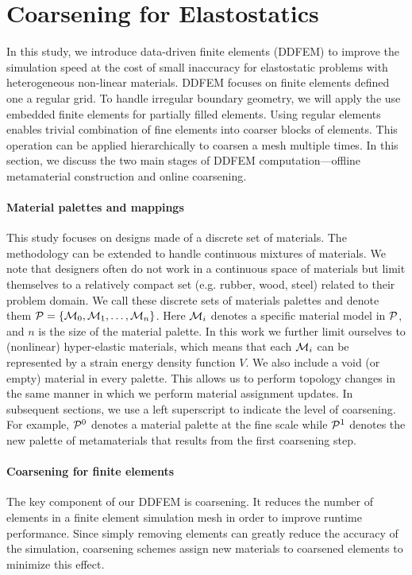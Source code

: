 \section{Coarsening for Elastostatics}
In this study, we introduce data-driven finite elements (DDFEM) to 
improve the simulation speed at the cost of small inaccuracy for elastostatic problems with heterogeneous non-linear materials. DDFEM focuses on finite elements defined one a regular grid.
To handle irregular boundary geometry, we will apply the use embedded finite elements for partially filled elements.
Using regular elements enables trivial combination of fine elements into coarser blocks of elements. This operation can be applied hierarchically to coarsen a mesh multiple times.
In this section, we discuss the two main stages of DDFEM computation---offline metamaterial construction and online coarsening.

\paragraph{Material palettes and mappings}
This study focuses on designs made of a discrete set of materials. The methodology can be extended to handle continuous mixtures of materials.
We note that designers often do not work in a continuous space of materials but limit themselves to a relatively compact set (e.g. rubber, wood, steel) related to their problem domain. We call these discrete sets of materials palettes and denote them $\mathcal{P}=\{\mathcal{M}_0, \mathcal{M}_1, \hdots, \mathcal{M}_n\}$. Here $\mathcal{M}_i$ denotes a specific material model in $\mathcal{P}$, and $n$ is the size of the material palette. In this work we further limit ourselves to (nonlinear) hyper-elastic materials, which means that each $\mathcal{M}_i$ can be represented by a strain energy density function $V$.
We also include a void (or empty) material in every palette. This allows us to perform topology changes in the same manner in which we perform material assignment updates.
In subsequent sections, we use a left superscript to indicate the level of coarsening. For example, $\mathcal{P}^0$ denotes a material palette at the fine scale while $\mathcal{P}^1$ denotes the new palette of metamaterials that results from the first coarsening step.

\paragraph{Coarsening for finite elements}
The key component of our DDFEM is coarsening. It reduces the number of elements in a finite element simulation mesh in order to improve runtime performance. Since simply removing elements can greatly reduce the accuracy of the simulation, coarsening schemes assign new materials to coarsened elements to minimize this effect.

